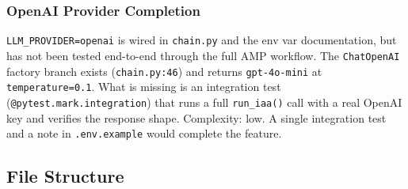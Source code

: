 \documentclass[12pt,a4paper]{article}
\begin{document}
\subsubsection{OpenAI Provider Completion}

\texttt{LLM\_PROVIDER=openai} is wired in \texttt{chain.py} and the env var
documentation, but has not been tested end-to-end through the full AMP workflow.
The \texttt{ChatOpenAI} factory branch exists (\texttt{chain.py:46}) and returns
\texttt{gpt-4o-mini} at \texttt{temperature=0.1}. What is missing is an integration
test (\texttt{@pytest.mark.integration}) that runs a full \texttt{run\_iaa()} call
with a real OpenAI key and verifies the response shape. Complexity: low. A single
integration test and a note in \texttt{.env.example} would complete the feature.

\subsection{File Structure}
\end{document}
